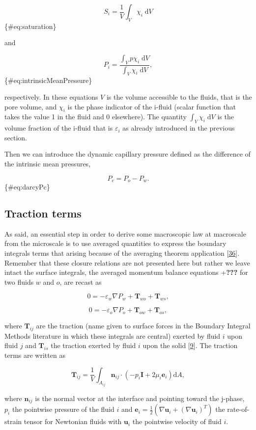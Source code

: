 \documentclass[]{article}
\begin{document}
\[
S_i = \frac{1}{V} \int_{V}\chi_{i}\;\mathrm{d}V
\] \{\#eq:saturation\}

and

\[
P_{i}=\frac{\int_{V}p\chi_{i}\;\mathrm{d}V}{\int_{V}\chi_{i}\;\mathrm{d}V},
\] \{\#eq:intrinsicMeanPressure\}

respectively. In these equations \(V\) is the volume accessible to the
fluids, that is the pore volume, and \(\chi_i\) is the phase indicator
of the i-fluid (scalar function that takes the value 1 in the fluid and
0 elsewhere). The quantity \(\int_{V}\chi_{i}\;\mathrm{d}V\) is the
volume fraction of the i-fluid that is \(\varepsilon_{i}\) as already
introduced in the previous section.

Then we can introduce the dynamic capillary pressure defined as the
difference of the intrinsic mean pressures,

\[
P_{c}=P_{o}-P_{w}.
\] \{\#eq:darcyPc\}

\hypertarget{traction-terms}{%
\subsection{Traction terms}\label{traction-terms}}

As said, an essential step in order to derive some macroscopic law at
macroscale from the microscale is to use averaged quantities to express
the boundary integrals terms that arising because of the averaging
theorem application {[}\protect\hyperlink{ref-Whitaker2013}{36}{]}.
Remember that these closure relations are not presented here but rather
we leave intact the surface integrals, the averaged momentum balance
equations +\textbf{???} for two fluids \(w\) and \(o\), are recast as

\[
0=-\varepsilon_{w}\nabla P_{w}+\mathbf{T}_{wo}+\mathbf{T}_{ws}, 
\]

\[
0=-\varepsilon_{o}\nabla P_{o}+\mathbf{T}_{ow}+\mathbf{T}_{os},
\]

where \(\mathbf{T}_{ij}\) are the traction (name given to surface forces
in the Boundary Integral Methods literature in which these integrals are
central) exerted by fluid \(i\) upon fluid \(j\) and \(\mathbf{T}_{is}\)
the traction exerted by fluid \(i\) upon the solid
{[}\protect\hyperlink{ref-Kalaydjian1987}{9}{]}. The traction terms are
written as

\[
\mathbf{T}_{ij}=\frac{1}{V}\int_{A_{ij}}\mathbf{n}_{ij}\cdot\left(-p_{i}\mathbf{I}+2\mu_{i}\mathbf{e}_{i}\right)\mathrm{d}A,
\]

where \(\mathbf{n}_{ij}\) is the normal vector at the interface and
pointing toward the j-phase, \(p_{i}\) the pointwise pressure of the
fluid \(i\) and
\(\mathbf{e}_{i}=\frac{1}{2}\left(\nabla\mathbf{u}_{i}+\left(\nabla\mathbf{u}_{i}\right)^{T}\right)\)
the rate-of-strain tensor for Newtonian fluids with \(\mathbf{u}_{i}\)
the pointwise velocity of fluid \(i\).
\end{document}
